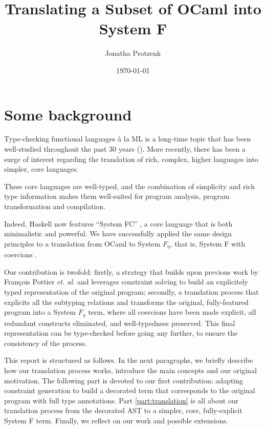 \documentclass[10pt,a4paper,twoside,titlepage,twocolumn]{article}
\title{Translating a Subset of OCaml into System F}
\author{Jonatha\wf{n} Protzenk\wf{o}}
\date{\today}
\begin{document}
{
\maketitle}
\tableofcontents

\part{Some background}

Type-checking functional languages à la ML is a long-time topic that has been
well-studied throughout the past 30 years
(\cite{huet1975unification,gordon1978metalanguage,damas1982principal}). More
recently, there has been a surge of interest regarding the translation of rich,
complex, higher languages into simpler, core languages.

These core languages are well-typed, and the combination of simplicity and rich
type information makes them well-suited for program analysis, program
transformation and compilation.

Indeed, Haskell now features ``System FC'' \cite{sulzmann2007system}, a core
language that is both minimalistic and powerful. We have successfully applied
the same design principles to a translation from OCaml \cite{ocaml} to System
$F_{\eta}$, that is, System F with coercions \cite{mitchell-88}.

Our contribution is twofold: firstly, a strategy that builds upon previous work by
François Pottier \emph{et. al.} \cite{pottier2005essence} and leverages
constraint solving to build an explicitely typed representation of the original
program; secondly, a translation process that explicits all the subtyping
relations and transforms the original, fully-featured program into a System
$F_{\eta}$ term, where all coercions have been made explicit, all redundant
constructs eliminated, and well-typedness preserved. This final representation
can be type-checked before going any further, to ensure the consistency of the
process.

This report is structured as follows. In the next paragraphs, we briefly
describe how our translation process works, introduce the main concepts and our
original motivation. The following part is devoted to our first contribution:
adapting constraint generation to build a decorated term that corresponds to the
original program with full type annotations. Part \ref{part:translation} is all
about our translation process from the decorated AST to a simpler, core,
fully-explicit System F term. Finally, we reflect on our work and possible
extensions.
\end{document}
